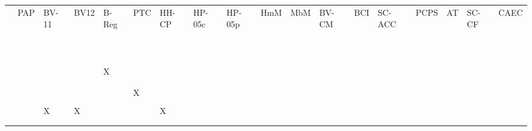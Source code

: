 \documentclass[11pt,a4paper]{book}
\theoremstyle{definition}
\theoremstyle{definition}
\theoremstyle{definition}
\theoremstyle{remark}
\begin{document}
 \begin{table}
\centering
\tiny
\begin{tabular}{lp{0.5cm}p{0.5cm}p{0.5cm}p{0.5cm}p{0.5cm}p{0.5cm}p{0.5cm}p{0.5cm}p{0.5cm}p{0.5cm}p{0.5cm}p{0.5cm}p{0.5cm}p{0.5cm}p{0.5cm}p{0.5cm}p{0.5cm}}
\toprule
	 & PAP	 & BV-11  & BV12	 & B-Reg	 & PTC	 & HH-CP	 & HP-05c	 & HP-05p	 & HmM	 & MbM	 & BV-CM	 & BCI	 & SC-ACC	 & PCPS	 & AT	 & SC-CF	 & CAEC	\\
\cite{vennekens2010embracing} 	& 	& 	& 	& 	& 	& 	& 	& 	& 	& 	& 	& 	& 	& 	& 	& 	& 	\\
 \cite{bex2010hybrid} 	& 	& 	& 	& 	& 	& 	& 	& 	& 	& 	& 	& 	& 	& 	& 	& 	& 	\\
 \cite{lee2010representing}	& 	& 	& 	& 	& 	& 	& 	& 	& 	& 	& 	& 	& 	& 	& 	& 	& 	\\
 \cite{lifschitz2010translating} 	& 	& 	& 	& 	& 	& 	& 	& 	& 	& 	& 	& 	& 	& 	& 	& 	& 	\\
 \cite{glymour2010actual}	& 	& 	& 	& 	& 	& 	& 	& 	& 	& 	& 	& 	& 	& 	& 	& 	& 	\\
 \cite{claassen2010causal} 	& 	& 	& 	& 	& 	& 	& 	& 	& 	& 	& 	& 	& 	& 	& 	& 	& 	\\
 \cite{gerstenberg2010spreading}	& 	& 	& 	& 	& 	& 	& 	& 	& 	& 	& 	& 	& 	& 	& 	& 	& 	\\
 \cite{halpern2011actual} 	& 	& 	& 	& 	& 	& 	& 	& 	& 	& 	& 	& 	& 	& 	& 	& 	& 	\\
 \cite{shulz2011if} 	& 	& 	& 	& 	& 	& 	& 	& 	& 	& 	& 	& 	& 	& 	& 	& 	& 	\\
 \cite{briggs2012interventionist}	& 	& 	& 	& 	& 	& 	& 	& 	& 	& 	& 	& 	& 	& 	& 	& 	& 	\\
 \cite{baumgartner2013regularity} 	& 	& 	& 	& X	& 	& 	& 	& 	& 	& 	& 	& 	& 	& 	& 	& 	& 	\\
 \cite{hyttinen2013discovering} 	& 	& 	& 	& 	& 	& 	& 	& 	& 	& 	& 	& 	& 	& 	& 	& 	& 	\\
 \cite{halpern2015graded} 	& 	& 	& 	& 	& 	& 	& 	& 	& 	& 	& 	& 	& 	& 	& 	& 	& 	\\
 \cite{weslake2015partial} 	& 	& 	& 	& 	& X	& 	& 	& 	& 	& 	& 	& 	& 	& 	& 	& 	& 	\\
 \cite{chockler2015causal}  	& 	& 	& 	& 	& 	& 	& 	& 	& 	& 	& 	& 	& 	& 	& 	& 	& 	\\
 \cite{beckers2016general} 	& 	& X	& X	& 	& 	& X	& 	& 	& 	& 	& 	& 	& 	& 	& 	& 	& 	\\
 \cite{schaffer2016grounding}  	& 	& 	& 	& 	& 	& 	& 	& 	& 	& 	& 	& 	& 	& 	& 	& 	& 	\\
 \cite{halpern2016appropriate} 	& 	& 	& 	& 	& 	& 	& 	& 	& 	& 	& 	& 	& 	& 	& 	& 	& 	\\

\end{tabular}
\end{table}
\end{document}

